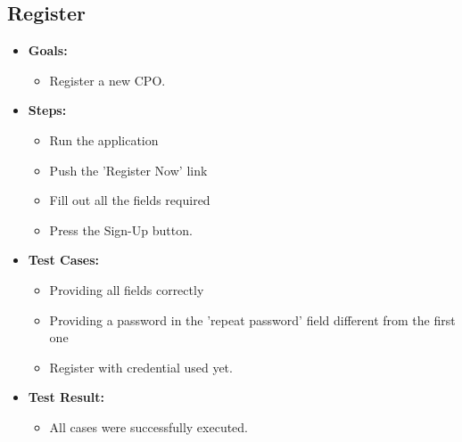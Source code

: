 \documentclass{Configuration_Files/PoliMi3i_thesis}
\begin{document}
\subsection{Register}
\begin{itemize}
    \item\textbf{Goals:}
        \begin{itemize}
            \item Register a new CPO.
        \end{itemize}
    \item \textbf{Steps:}
        \begin{itemize}
            \item Run the application 
            \item Push the 'Register Now' link
            \item Fill out all the fields required 
            \item Press the Sign-Up button. 
    \end{itemize}
    \item \textbf{Test Cases:}
        \begin{itemize}
            \item Providing all fields correctly
            \item Providing a password in the 'repeat password' field different from the first one
            \item Register with credential used yet.
    \end{itemize}
    \item\textbf{Test Result:}
        \begin{itemize}
            \item All cases were successfully executed.
    \end{itemize}
\end{itemize}
\end{document}
